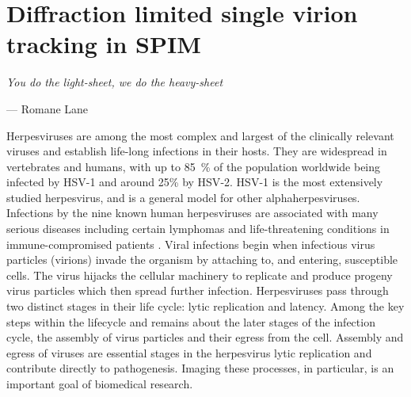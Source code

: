 \ifpdf
    \graphicspath{{Chapters/spt/Figs/Raster/}{Chapters/spt/Figs/PDF/}{Chapters/spt/Figs/}}
\else
    \graphicspath{{Chapters/spt/Figs/Vector/}{Chapters/spt/Figs/}}
\fi

\chapter{Diffraction limited single virion tracking in SPIM}\label{chapter:spt}

\epigraph{\emph{You do the light-sheet, we do the heavy-sheet}}{--- Romane Lane}

Herpesviruses are among the most complex and largest of the clinically relevant viruses and establish life-long infections in their hosts.
They are widespread in vertebrates and humans, with up to \SI{85}{\percent} of the population worldwide being infected by \gls{HSV}-1 and around 25\% by \gls{HSV}-2.
\gls{HSV}-1 is the most extensively studied herpesvirus, and is a general model for other alphaherpesviruses.
Infections by the nine known human herpesviruses are associated with many serious diseases including certain lymphomas and life-threatening conditions in immune-compromised patients \cite{[1]}.
Viral infections begin when infectious virus particles (\gls{virion}s) invade the organism by attaching to, and entering, susceptible cells.
The virus hijacks the cellular machinery to replicate and produce progeny virus particles which then spread further infection.
Herpesviruses pass through two distinct stages in their life cycle: lytic replication and latency.
Among the key steps within the lifecycle and remains about the later
stages of the infection cycle, the assembly of virus particles and their egress from the cell.
Assembly and egress of viruses are essential stages in the herpesvirus lytic replication and contribute directly to pathogenesis.
Imaging these processes, in particular, is an important goal of biomedical research.


